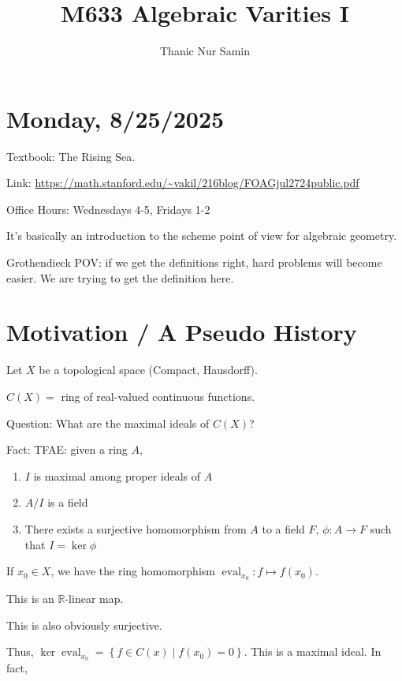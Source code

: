 \documentclass{article}
\title{M633 Algebraic Varities I}
\author{Thanic Nur Samin}
\date{}
\theoremstyle{definition}
\begin{document}
    \maketitle

    \section*{Monday, 8/25/2025}
    
    Textbook: The Rising Sea.
    
    Link: \url{https://math.stanford.edu/~vakil/216blog/FOAGjul2724public.pdf}

    Office Hours: Wednesdays 4-5, Fridays 1-2

    It's basically an introduction to the scheme point of view for algebraic geometry.

    Grothendieck POV: if we get the definitions right, hard problems will become easier. We are trying to get the definition here.

    \section*{Motivation / A Pseudo History}

    Let \(X\) be a topological space (Compact, Hausdorff).

    \(C(X)=\) ring of real-valued continuous functions.

    Question: What are the maximal ideals of \(C(X)\)?

    Fact: TFAE: given a ring \(A\),

    \begin{enumerate}[label=\roman*)]
        \item \(I\) is maximal among proper ideals of \(A\)
        \item \(A / I\) is a field
        \item There exists a surjective homomorphism from \(A\) to a field \(F\), \(\phi : A \to F\) such that \(I = \ker \phi\)  
    \end{enumerate} 

    If \(x_0\in X\), we have the ring homomorphism \(\operatorname{eval}_{x_0}: f \mapsto f(x_0)\).

    This is an \(\mathbb{R}\)-linear map.

    This is also obviously surjective.

    Thus, \(\ker \operatorname{eval}_{x_0} = \left\{ f\in C(x) \mid f(x_0) = 0 \right\}\). This is a maximal ideal. In fact,
\end{document}
